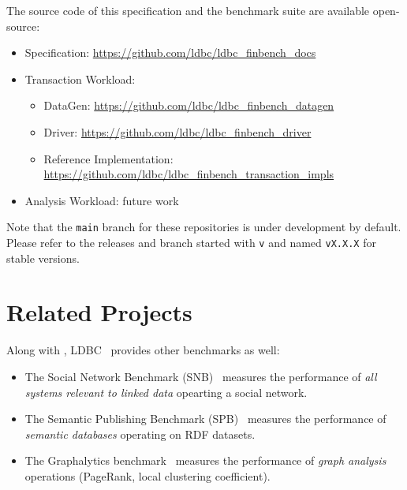 The source code of this specification and the benchmark suite are available
open-source:
\begin{itemize}
    \item \ldbcfinbench Specification: \url{https://github.com/ldbc/ldbc_finbench_docs}
    \item Transaction Workload:
          \begin{itemize}
              \item \ldbcfinbench DataGen: \url{https://github.com/ldbc/ldbc_finbench_datagen}
              \item \ldbcfinbench Driver: \url{https://github.com/ldbc/ldbc_finbench_driver}
              \item \ldbcfinbench Reference Implementation: \url{https://github.com/ldbc/ldbc_finbench_transaction_impls}
          \end{itemize}
    \item Analysis Workload: future work
\end{itemize}

Note that the \texttt{main} branch for these repositories is under development by default.
Please refer to the releases and branch started with \texttt{v} and named \texttt{vX.X.X}
for stable versions.


\section{Related Projects}

Along with \ldbcfinbench, LDBC~\cite{DBLP:journals/sigmod/AnglesBLF0ENMKT14} provides other
benchmarks as well:

\begin{itemize}
    \item The Social Network Benchmark (SNB)~\cite{DBLP:journals/corr/abs-2001-02299} measures
          the performance of \emph{all systems relevant to linked data} opearting a social network.
    \item The Semantic Publishing Benchmark (SPB)~\cite{DBLP:conf/semweb/SpasicJP16} measures
          the performance of \emph{semantic databases} operating on RDF datasets.
    \item The Graphalytics benchmark~\cite{DBLP:journals/pvldb/IosupHNHPMCCSAT16} measures the
          performance of \emph{graph analysis} operations (\eg PageRank, local clustering coefficient).
\end{itemize}